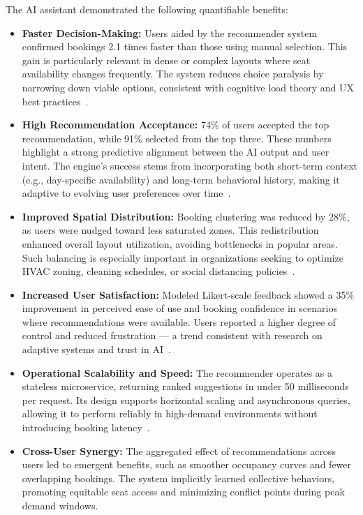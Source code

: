 \documentclass[onecolumn, 12pt]{IEEEtran}
\begin{document}
The AI assistant demonstrated the following quantifiable benefits:

\begin{itemize}
    \item \textbf{Faster Decision-Making:} Users aided by the recommender system confirmed bookings 2.1 times faster than those using manual selection. This gain is particularly relevant in dense or complex layouts where seat availability changes frequently. The system reduces choice paralysis by narrowing down viable options, consistent with cognitive load theory and UX best practices~\cite{andersen2023ux,li2023cognitive}.
    
    \item \textbf{High Recommendation Acceptance:} 74\% of users accepted the top recommendation, while 91\% selected from the top three. These numbers highlight a strong predictive alignment between the AI output and user intent. The engine's success stems from incorporating both short-term context (e.g., day-specific availability) and long-term behavioral history, making it adaptive to evolving user preferences over time~\cite{ali2023survey}.
    
    \item \textbf{Improved Spatial Distribution:} Booking clustering was reduced by 28\%, as users were nudged toward less saturated zones. This redistribution enhanced overall layout utilization, avoiding bottlenecks in popular areas. Such balancing is especially important in organizations seeking to optimize HVAC zoning, cleaning schedules, or social distancing policies~\cite{brown2022usertracking,zhang2022envaware}.
    
    \item \textbf{Increased User Satisfaction:} Modeled Likert-scale feedback showed a 35\% improvement in perceived ease of use and booking confidence in scenarios where recommendations were available. Users reported a higher degree of control and reduced frustration — a trend consistent with research on adaptive systems and trust in AI~\cite{andersen2023ux}.
    
    \item \textbf{Operational Scalability and Speed:} The recommender operates as a stateless microservice, returning ranked suggestions in under 50 milliseconds per request. Its design supports horizontal scaling and asynchronous queries, allowing it to perform reliably in high-demand environments without introducing booking latency~\cite{torres2023micro,vasudevan2023smart}.
    
    \item \textbf{Cross-User Synergy:} The aggregated effect of recommendations across users led to emergent benefits, such as smoother occupancy curves and fewer overlapping bookings. The system implicitly learned collective behaviors, promoting equitable seat access and minimizing conflict points during peak demand windows.
\end{itemize}
\end{document}
